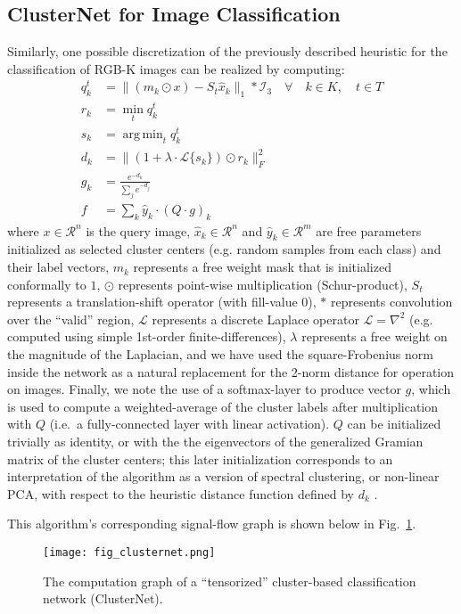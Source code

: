 \documentclass{article}
\DeclareMathOperator*{\argmin}{arg\,min}
\begin{document}
\subsection*{ClusterNet for Image Classification}
Similarly, one possible discretization of the previously described heuristic for the classification of RGB-K images can be realized by computing:
\begin{align*}
    q_k^t &= \|(m_k \odot x) - S_t \hat{x}_k\|_1 * \mathcal{I}_3 \quad \forall \quad k \in K,\quad t\in T \\
    r_k &= \min_t q_k^t \\
    s_k &= \argmin_t q_k^t \\
    d_k &= \|(1 + \lambda \cdot \mathcal{L}\{s_k\}) \odot r_k \|_F^2 \\
    g_k &= \frac{e^{-d_k}}{\sum_j e^{-d_j}} \\
    f &= \sum_k \hat{y}_k \cdot (Q \cdot g)_k %
\end{align*}
where $x \in \mathcal{R}^n$ is the query image, $\hat{x}_k \in \mathcal{R}^n$ and $\hat{y}_k \in \mathcal{R}^m$ are free parameters initialized as selected cluster centers (e.g. random samples from each class) and their label vectors, $m_k$ represents a free weight mask that is initialized conformally to $1$, $\odot$ represents point-wise multiplication (Schur-product), $S_t$ represents a translation-shift operator (with fill-value 0), $*$ represents convolution over the ``valid'' region, $\mathcal{L}$ represents a discrete Laplace operator $\mathcal{L} = \nabla^2$ (e.g. computed using simple 1st-order finite-differences), $\lambda$ represents a free weight on the magnitude of the Laplacian, and we have used the square-Frobenius norm inside the network as a natural replacement for the 2-norm distance for operation on images. Finally, we note the use of a softmax-layer to produce vector $g$, which is used to compute a weighted-average of the cluster labels after multiplication with $Q$ (i.e.~a fully-connected layer with linear activation). $Q$ can be initialized trivially as identity, or with the the eigenvectors of the generalized Gramian matrix of the cluster centers; this later initialization corresponds to an interpretation of the algorithm as a version of spectral clustering, or non-linear PCA, with respect to the heuristic distance function defined by $d_k$ \cite{baldi1989neural,hyvarinen2000independent,cho2009kernel}. 

This algorithm's corresponding signal-flow graph is shown below in Fig.~\ref{fig:cluster_graph}.
\begin{figure}[hbt!]
    \centering
    \texttt{[image: fig\_clusternet.png]}
    \caption{The computation graph of a ``tensorized'' cluster-based classification network (ClusterNet).} \label{fig:cluster_graph}
    \vspace{-3mm}
\end{figure}
\end{document}
